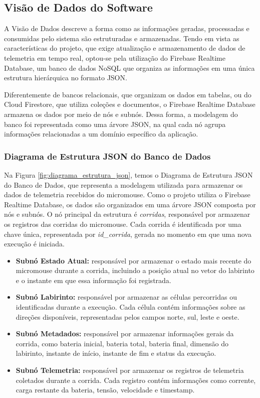 \subsection{Visão de Dados do Software} 
A Visão de Dados descreve a forma como as informações geradas, processadas e consumidas pelo sistema são estruturadas e armazenadas. Tendo em vista as características do projeto, que exige atualização e armazenamento de dados de telemetria em tempo real, optou-se pela utilização do Firebase Realtime Database, um banco de dados NoSQL que organiza as informações em uma única estrutura hierárquica no formato JSON.

Diferentemente de bancos relacionais, que organizam os dados em tabelas, ou do Cloud Firestore, que utiliza coleções e documentos, o Firebase Realtime Database armazena os dados por meio de nós e subnós. Dessa forma, a modelagem do banco foi representada como uma árvore JSON, na qual cada nó agrupa informações relacionadas a um domínio específico da aplicação.
\subsubsection{Diagrama de Estrutura JSON do Banco de Dados}

Na Figura \ref{fig:diagrama_estrutura_json}, temos o Diagrama de Estrutura JSON do Banco de Dados, que representa a modelagem utilizada para armazenar os dados de telemetria recebidos do micromouse. Como o projeto utiliza o Firebase Realtime Database, os dados são organizados em uma árvore JSON composta por nós e subnós. O nó principal da estrutura é \textit{corridas}, responsável por armazenar os registros das corridas do micromouse. Cada corrida é identificada por uma chave única, representada por \textit{id\_corrida}, gerada no momento em que uma nova execução é iniciada.

\begin{itemize}
    \item \textbf{Subnó Estado Atual:} responsável por armazenar o estado mais recente do micromouse durante a corrida, incluindo a posição atual no vetor do labirinto e o instante em que essa informação foi registrada.

    \item \textbf{Subnó Labirinto:} responsável por armazenar as células percorridas ou identificadas durante a execução. Cada célula contém informações sobre as direções disponíveis, representadas pelos campos norte, sul, leste e oeste.

    \item \textbf{Subnó Metadados:} responsável por armazenar informações gerais da corrida, como bateria inicial, bateria total, bateria final, dimensão do labirinto, instante de início, instante de fim e status da execução.

    \item \textbf{Subnó Telemetria:} responsável por armazenar os registros de telemetria coletados durante a corrida. Cada registro contém informações como corrente, carga restante da bateria, tensão, velocidade e timestamp.
\end{itemize}

